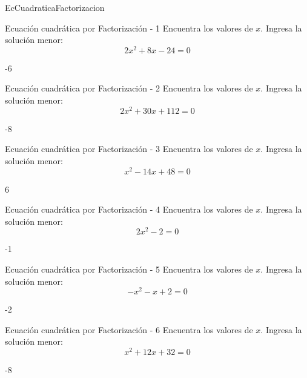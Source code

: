 \documentclass[a4,11pt]{aleph-notas}
\begin{document}
\begin{quiz}{EcCuadraticaFactorizacion}

\begin{numerical}[]%
    {Ecuación cuadrática por Factorización - 1}
    Encuentra los valores de $x$. Ingresa la solución menor:
    \[
        2 x^{2} + 8 x - 24 = 0
    \]
    \item[] -6
\end{numerical}

\begin{numerical}[]%
    {Ecuación cuadrática por Factorización - 2}
    Encuentra los valores de $x$. Ingresa la solución menor:
    \[
        2 x^{2} + 30 x + 112 = 0
    \]
    \item[] -8
\end{numerical}

\begin{numerical}[]%
    {Ecuación cuadrática por Factorización - 3}
    Encuentra los valores de $x$. Ingresa la solución menor:
    \[
        x^{2} - 14 x + 48 = 0
    \]
    \item[] 6
\end{numerical}

\begin{numerical}[]%
    {Ecuación cuadrática por Factorización - 4}
    Encuentra los valores de $x$. Ingresa la solución menor:
    \[
        2 x^{2} - 2 = 0
    \]
    \item[] -1
\end{numerical}

\begin{numerical}[]%
    {Ecuación cuadrática por Factorización - 5}
    Encuentra los valores de $x$. Ingresa la solución menor:
    \[
        - x^{2} - x + 2 = 0
    \]
    \item[] -2
\end{numerical}

\begin{numerical}[]%
    {Ecuación cuadrática por Factorización - 6}
    Encuentra los valores de $x$. Ingresa la solución menor:
    \[
        x^{2} + 12 x + 32 = 0
    \]
    \item[] -8
\end{numerical}


\end{quiz}
\end{document}
